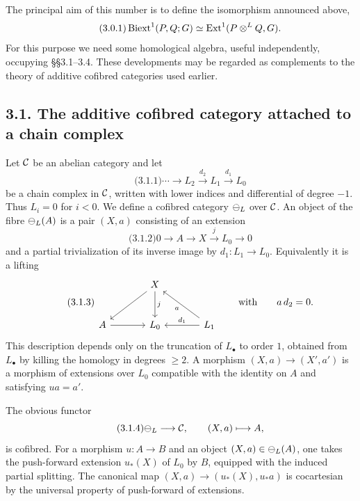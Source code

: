 \documentclass[11pt]{article}
\providecommand{\Ext}{\operatorname{Ext}}
\begin{document}
The principal aim of this number is to define the isomorphism announced above,
\begin{equation}\qquad\text{(3.0.1)}
  \Biext^1(P,Q;G)\simeq \Ext^1(P\otimes^{L}Q,G).
\end{equation}
For this purpose we need some homological algebra, useful independently, occupying \S\S3.1--3.4.  These developments may be regarded as complements to the theory of additive cofibred categories used earlier.

\subsection*{3.1. The additive cofibred category attached to a chain complex}
Let \(\mathcal C\) be an abelian category and let
\begin{equation}\qquad\text{(3.1.1)}
  \cdots\longrightarrow L_2\xrightarrow{d_2}L_1\xrightarrow{d_1}L_0
\end{equation}
be a chain complex in \(\mathcal C\), written with lower indices and differential of degree \(-1\).  Thus \(L_i=0\) for \(i<0\).  We define a cofibred category \(\mathcal\Psi_L\) over \(\mathcal C\).  An object of the fibre \(\mathcal\Psi_L(A)\) is a pair \((X,a)\) consisting of an extension
\begin{equation}\qquad\text{(3.1.2)}
  0\longrightarrow A\longrightarrow X\xrightarrow{j}L_0\longrightarrow 0
\end{equation}
and a partial trivialization of its inverse image by \(d_1:L_1\to L_0\).  Equivalently it is a lifting
\begin{equation}\qquad\text{(3.1.3)}
\begin{tikzcd}[column sep=large,row sep=large]
& X \arrow[d,"j"]\arrow[dl] & \\
A \arrow[r] & L_0 & L_1\arrow[l,"d_1"']\arrow[ul,"a"]
\end{tikzcd}
\qquad\text{with}\qquad a\,d_2=0.
\end{equation}
This description depends only on the truncation of \(L_\bullet\) to order \(1\), obtained from \(L_\bullet\) by killing the homology in degrees \(\geq2\).  A morphism \((X,a)\to(X',a')\) is a morphism of extensions over \(L_0\) compatible with the identity on \(A\) and satisfying \(u a=a'\).

The obvious functor
\begin{equation}\qquad\text{(3.1.4)}
  \mathcal\Psi_L\longrightarrow \mathcal C,
  \qquad (X,a)\longmapsto A,
\end{equation}
is cofibred.  For a morphism \(u:A\to B\) and an object \((X,a)\in\mathcal\Psi_L(A)\), one takes the push-forward extension \(u_*(X)\) of \(L_0\) by \(B\), equipped with the induced partial splitting.  The canonical map \((X,a)\to(u_*(X),u_*a)\) is cocartesian by the universal property of push-forward of extensions.
\end{document}

